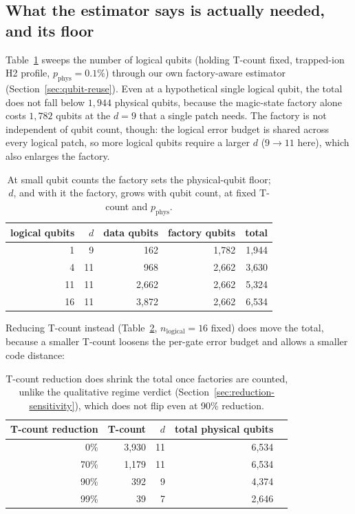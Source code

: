 \documentclass[9pt,twocolumn]{extarticle}
\begin{document}
\subsection{What the estimator says is actually needed, and its floor}
Table~\ref{tab:demo-threshold} sweeps the number of logical qubits (holding
T-count fixed, trapped-ion H2 profile, $p_{\mathrm{phys}}=0.1\%$) through our own factory-aware
estimator (Section~\ref{sec:qubit-reuse}). Even at a hypothetical single
logical qubit, the total does not fall below $1{,}944$ physical
qubits, because the magic-state factory alone costs $1{,}782$ qubits at
the $d=9$ that a single patch needs. The factory is not independent of
qubit count, though: the logical error budget is shared across every
logical patch, so more logical qubits require a larger $d$ ($9\to11$
here), which also enlarges the factory.
\begin{table}[h]
\centering
\begin{tabular}{rrrrr}
\toprule
logical qubits & $d$ & data qubits & factory qubits & total \\
\midrule
1  & 9  & 162     & 1{,}782 & 1{,}944 \\
4  & 11 & 968     & 2{,}662 & 3{,}630 \\
11 & 11 & 2{,}662 & 2{,}662 & 5{,}324 \\
16 & 11 & 3{,}872 & 2{,}662 & 6{,}534 \\
\bottomrule
\end{tabular}
\caption{At small qubit counts the factory sets the physical-qubit floor;
$d$, and with it the factory, grows with qubit count, at fixed T-count and
$p_{\mathrm{phys}}$.}
\label{tab:demo-threshold}
\end{table}
Reducing T-count instead (Table~\ref{tab:demo-tcount}, $n_{\text{logical}}=16$
fixed) does move the total, because a smaller T-count loosens the
per-gate error budget and allows a smaller code distance:
\begin{table}[h]
\centering
\begin{tabular}{rrrrr}
\toprule
T-count reduction & T-count & $d$ & total physical qubits \\
\midrule
0\%  & 3{,}930 & 11 & 6{,}534 \\
70\% & 1{,}179 & 11 & 6{,}534 \\
90\% & 392     & 9  & 4{,}374 \\
99\% & 39      & 7  & 2{,}646 \\
\bottomrule
\end{tabular}
\caption{T-count reduction does shrink the total once factories are
counted, unlike the qualitative regime verdict (Section~\ref{sec:reduction-sensitivity}),
which does not flip even at 90\% reduction.}
\label{tab:demo-tcount}
\end{table}
\end{document}
